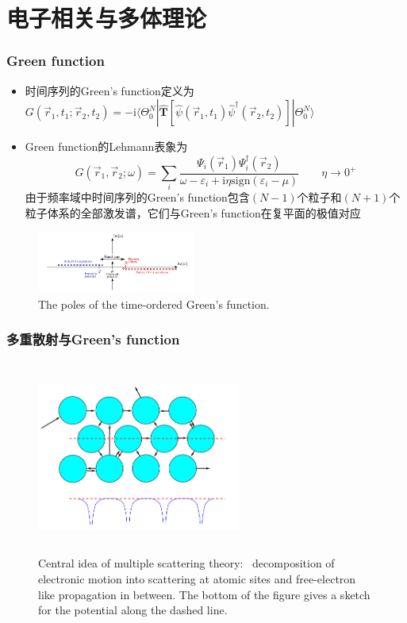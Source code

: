 \documentclass[cjk,slidestop,compress,mathserif,blue]{beamer}
\begin{document}
\section{电子相关与多体理论}
\frame
{
	\frametitle{\textrm{Green function}}
	\begin{itemize}
		\item 时间序列的\textrm{Green's function}定义为$G(\vec r_1,t_1;\vec r_2,t_2)=-\mathrm{i}\langle\Theta_0^N|\hat{\mathbf{T}}[\hat\psi(\vec r_1,t_1)\hat\psi^{\dag}(\vec r_2,t_2)]|\Theta_0^N\rangle$
		\item \textrm{Green function}的\textrm{Lehmann}表象为$$G(\vec r_1,\vec r_2;\omega)=\sum\limits_i\dfrac{\Psi_i(\vec r_1)\Psi_i^{\dag}(\vec r_2)}{\omega-\varepsilon_i+\mathrm{i}\eta\mathrm{sign}(\varepsilon_i-\mu)}\qquad\eta\rightarrow0^+$$
			由于频率域中时间序列的\textrm{Green's function}包含$(N-1)$个粒子和$(N+1)$个粒子体系的全部激发谱，它们与\textrm{Green's function}在复平面的极值对应
	\end{itemize}
\begin{figure}[h!]
\centering
\vspace{-5pt}
\includegraphics[height=0.80in,width=2.05in,viewport=30 1 660 265,clip]{Figures/GW-0.png}
\caption{\textrm{\small{The poles of the time-ordered Green's function.}}}%
\label{GW-0}
\end{figure}
}

\frame
{
	\frametitle{多重散射与\textrm{Green's function}}
\begin{figure}[h!]
\centering
	\vspace{-20pt}
\includegraphics[height=2.50in,width=2.64in,viewport=5 0 515 495,clip]{Figures/multiple-scattering_theory.png}
\caption{\tiny \textrm{Central idea of multiple scattering theory:~ decomposition of electronic motion into scattering at atomic sites and free-electron like propagation in between. The bottom of the figure gives a sketch for the potential along the dashed line.}}
\label{Multi-scattering}
\end{figure}
}
\end{document}
